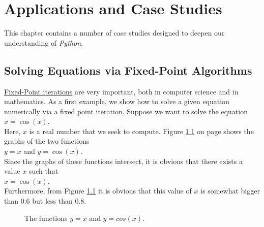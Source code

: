 \chapter{Applications and Case Studies}
This chapter contains a number of case studies designed to deepen our understanding of \textsl{Python}.

\section{Solving Equations via Fixed-Point Algorithms}
\href{https://en.wikipedia.org/wiki/Fixed-point_iteration}{Fixed-Point iterations} are very important, both in
computer science and in mathematics.  As a first example, we show how to solve a given equation numerically via
a fixed point iteration.  Suppose we want to solve the equation  
\\[0.2cm]
\hspace*{1.3cm} $x = \cos(x)$. \\[0.2cm]
Here, $x$ is a real number that we seek to compute.  Figure \ref{fig:xEqualsCosX.pdf} on page
\pageref{fig:xEqualsCosX.pdf} shows the graphs of the two functions  
\\[0.2cm]
\hspace*{1.3cm}
$y = x$  \quad and \quad $y = \cos(x)$.
\\[0.2cm]
Since the graphs of these functions intersect, it is obvious that there exists a value $x$ such that
\\[0.2cm]
\hspace*{1.3cm}
$x = \cos(x)$. 
\\[0.2cm] 
Furthermore, from Figure \ref{fig:xEqualsCosX.pdf} it is obvious that this value of $x$ is somewhat bigger than $0.6$
but less than $0.8$. 

\begin{figure}[!ht]
  \hspace*{-3.0cm}

  \caption{The functions $y = x$ and $y = cos(x)$.}
  \label{fig:xEqualsCosX.pdf}
\end{figure}



